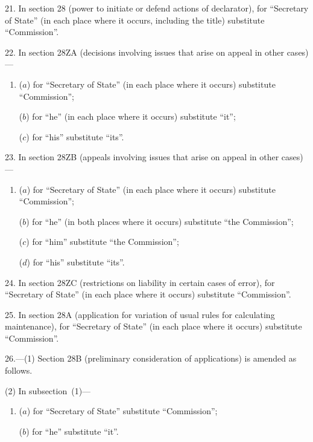 \documentclass[12pt,a4paper]{article}
\begin{document}
\medskip

21. In section 28 (power to initiate or defend actions of declarator), for “Secretary of State” (in each place where it occurs, including the title) substitute “Commission”.

\medskip

22. In section 28ZA (decisions involving issues that arise on appeal in other cases)—
\begin{enumerate}\item[]
($a$) for “Secretary of State” (in each place where it occurs) substitute “Commission”;

($b$) for “he” (in each place where it occurs) substitute “it”;

($c$) for “his” substitute “its”.
\end{enumerate}

\medskip

23. In section 28ZB (appeals involving issues that arise on appeal in other cases)—
\begin{enumerate}\item[]
($a$) for “Secretary of State” (in each place where it occurs) substitute “Commission”;

($b$) for “he” (in both places where it occurs) substitute “the Commission”;

($c$) for “him” substitute “the Commission”;

($d$) for “his” substitute “its”.
\end{enumerate}

\medskip

24. In section 28ZC (restrictions on liability in certain cases of error), for “Secretary of State” (in each place where it occurs) substitute “Commission”.

\medskip

25. In section 28A (application for variation of usual rules for calculating maintenance), for “Secretary of State” (in each place where it occurs) substitute “Commission”.

\medskip

26.---(1) Section 28B (preliminary consideration of applications) is amended as follows.

(2) In subsection~(1)—
\begin{enumerate}\item[]
($a$) for “Secretary of State” substitute “Commission”;

($b$) for “he” substitute “it”.
\end{enumerate}
\end{document}
